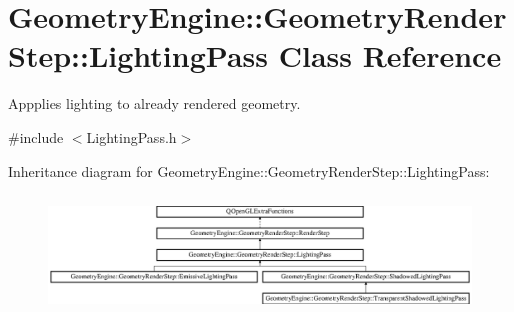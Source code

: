 \hypertarget{class_geometry_engine_1_1_geometry_render_step_1_1_lighting_pass}{}\section{Geometry\+Engine\+::Geometry\+Render\+Step\+::Lighting\+Pass Class Reference}
\label{class_geometry_engine_1_1_geometry_render_step_1_1_lighting_pass}


Appplies lighting to already rendered geometry.  




{\ttfamily \#include $<$Lighting\+Pass.\+h$>$}

Inheritance diagram for Geometry\+Engine\+::Geometry\+Render\+Step\+::Lighting\+Pass\+:\begin{figure}[H]
\begin{center}
\leavevmode
\includegraphics[height=3.160271cm]{class_geometry_engine_1_1_geometry_render_step_1_1_lighting_pass}
\end{center}
\end{figure}
